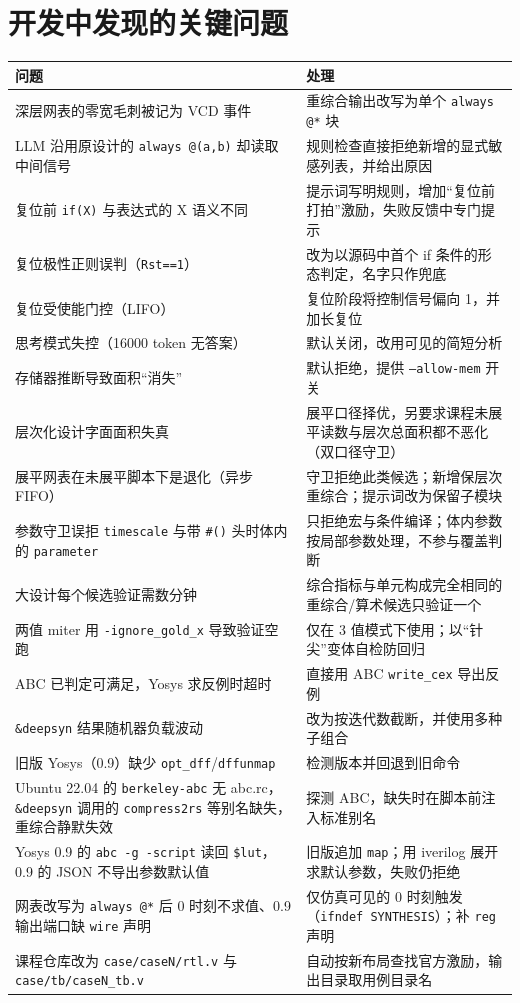 \documentclass[UTF8,a4paper,zihao=5]{ctexart}
\newcommand{\code}[1]{\texttt{#1}}
\begin{document}
\section{开发中发现的关键问题}
\begin{table}[h]\centering\small
\begin{tabularx}{\linewidth}{@{}lX@{}}
\toprule
问题 & 处理 \\ \midrule
深层网表的零宽毛刺被记为 VCD 事件 & 重综合输出改写为单个 \code{always @*} 块 \\
LLM 沿用原设计的 \code{always @(a,b)} 却读取中间信号 & 规则检查直接拒绝新增的显式敏感列表，并给出原因 \\
复位前 \code{if(X)} 与表达式的 X 语义不同 & 提示词写明规则，增加“复位前打拍”激励，失败反馈中专门提示 \\
复位极性正则误判（\code{Rst==1}） & 改为以源码中首个 if 条件的形态判定，名字只作兜底 \\
复位受使能门控（LIFO） & 复位阶段将控制信号偏向 1，并加长复位 \\
思考模式失控（16000 token 无答案） & 默认关闭，改用可见的简短分析 \\
存储器推断导致面积“消失” & 默认拒绝，提供 \code{--allow-mem} 开关 \\
层次化设计字面面积失真 & 展平口径择优，另要求课程未展平读数与层次总面积都不恶化（双口径守卫） \\
展平网表在未展平脚本下是退化（异步 FIFO） & 守卫拒绝此类候选；新增保层次重综合；提示词改为保留子模块 \\
参数守卫误拒 \code{\textasciigrave timescale} 与带 \code{\#()} 头时体内的 \code{parameter} & 只拒绝宏与条件编译；体内参数按局部参数处理，不参与覆盖判断 \\
大设计每个候选验证需数分钟 & 综合指标与单元构成完全相同的重综合/算术候选只验证一个 \\
两值 miter 用 \code{-ignore\_gold\_x} 导致验证空跑 & 仅在 3 值模式下使用；以“针尖”变体自检防回归 \\
ABC 已判定可满足，Yosys 求反例时超时 & 直接用 ABC \code{write\_cex} 导出反例 \\
\code{\&deepsyn} 结果随机器负载波动 & 改为按迭代数截断，并使用多种子组合 \\
旧版 Yosys（0.9）缺少 \code{opt\_dff}/\code{dffunmap} & 检测版本并回退到旧命令 \\
Ubuntu 22.04 的 \code{berkeley-abc} 无 abc.rc，\code{\&deepsyn} 调用的 \code{compress2rs} 等别名缺失，重综合静默失效 & 探测 ABC，缺失时在脚本前注入标准别名 \\
Yosys 0.9 的 \code{abc -g -script} 读回 \code{\$lut}，0.9 的 JSON 不导出参数默认值 & 旧版追加 \code{map}；用 iverilog 展开求默认参数，失败仍拒绝 \\
网表改写为 \code{always @*} 后 0 时刻不求值、0.9 输出端口缺 \code{wire} 声明 & 仅仿真可见的 0 时刻触发（\code{\textasciigrave ifndef SYNTHESIS}）；补 \code{reg} 声明 \\
课程仓库改为 \code{case/caseN/rtl.v} 与 \code{case/tb/caseN\_tb.v} & 自动按新布局查找官方激励，输出目录取用例目录名 \\
\bottomrule
\end{tabularx}
\end{table}
\end{document}
